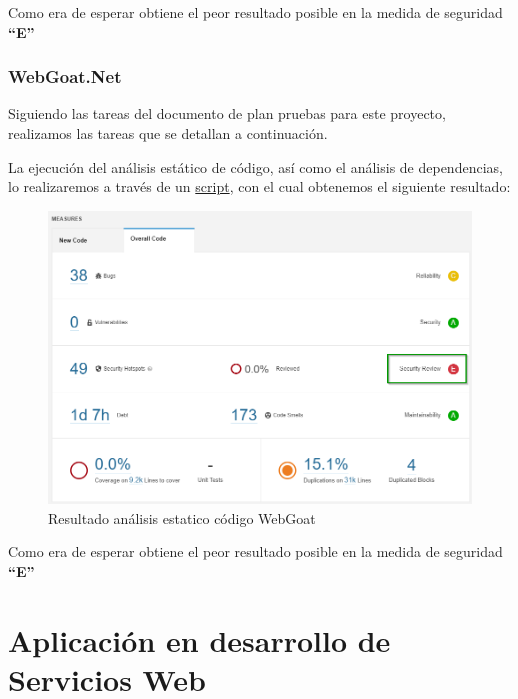 Como era de esperar obtiene el peor resultado posible en la medida de seguridad \textbf{“E”}\\

\newpage
\subsubsection{WebGoat.Net}
Siguiendo las tareas del documento de plan pruebas para este proyecto, realizamos las tareas que se detallan a continuación.

La ejecución del análisis estático de código, así como el análisis de dependencias, lo realizaremos a través de un 
\href{https://github.com/M0l1n3ta/PFG/blob/master/Scripts/STAT/RunSonarScaner_WebGoat.NET.ps1}{script}, con el cual obtenemos
el siguiente resultado:
\begin{figure}[h!]  
    \includegraphics[width=\linewidth]{./imagenes/10_AnalisisEstatico_WebGoat.Net.png}
    \caption{Resultado análisis estatico código WebGoat}  
    \label{fig:10}
\end{figure}
Como era de esperar obtiene el peor resultado posible en la medida de seguridad \textbf{“E”}

\newpage
\section{Aplicación en desarrollo de Servicios Web} 

